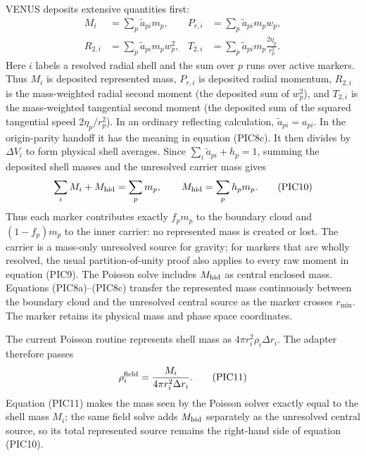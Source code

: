 VENUS deposits extensive quantities first:
\[
 \begin{aligned}
 M_i&=\sum_p \widetilde a_{pi}m_p,&
 P_{r,i}&=\sum_p \widetilde a_{pi}m_pw_p,\\
 R_{2,i}&=\sum_p \widetilde a_{pi}m_pw_p^2,&
 T_{2,i}&=\sum_p \widetilde a_{pi}m_p\frac{2\eta_p}{r_p^2}.
 \end{aligned}                                           \tag{PIC9}
\]
Here \(i\) labels a resolved radial shell and the sum over \(p\) runs over
active markers.  Thus \(M_i\) is deposited represented mass,
\(P_{r,i}\) is deposited radial momentum, \(R_{2,i}\) is the mass-weighted
radial second moment (the deposited sum of \(w_p^2\)), and \(T_{2,i}\) is the
mass-weighted tangential second moment (the deposited sum of the squared
tangential speed \(2\eta_p/r_p^2\)).
In an ordinary reflecting calculation,
\(\widetilde a_{pi}=a_{pi}\).  In the origin-parity handoff it has the
meaning in equation (PIC8c).
It then divides by \(\Delta V_i\) to form physical shell averages.  Since
\(\sum_i\widetilde a_{pi}+h_p=1\), summing the deposited shell masses and
the unresolved carrier mass gives
\[
 \sum_i M_i+M_{\rm hid}
 =\sum_p m_p,\qquad M_{\rm hid}=\sum_p h_pm_p.           \tag{PIC10}
\]
Thus each marker contributes exactly \(f_pm_p\) to the boundary cloud and
\((1-f_p)m_p\) to the inner carrier: no represented mass is created or
lost.  The carrier is a mass-only unresolved source for gravity; for markers
that are wholly resolved, the usual partition-of-unity proof also applies to
every raw moment in equation (PIC9).  The Poisson solve includes
\(M_{\rm hid}\) as central enclosed mass. Equations (PIC8a)--(PIC8c)
transfer the represented mass continuously between the boundary cloud and
the unresolved central source as the marker crosses \(r_{\min}\).
The marker retains its physical mass and phase space coordinates.

The current Poisson routine represents shell mass as
\(4\pi r_i^2\rho_i\Delta r_i\).  The adapter therefore passes
\[
 \rho_i^{\rm field}=\frac{M_i}{4\pi r_i^2\Delta r_i}.   \tag{PIC11}
\]
Equation (PIC11) makes the mass seen by the Poisson solver exactly equal to
the shell mass \(M_i\); the same field solve adds \(M_{\rm hid}\) separately
as the unresolved central source, so its total represented source remains the
right-hand side of equation (PIC10).

